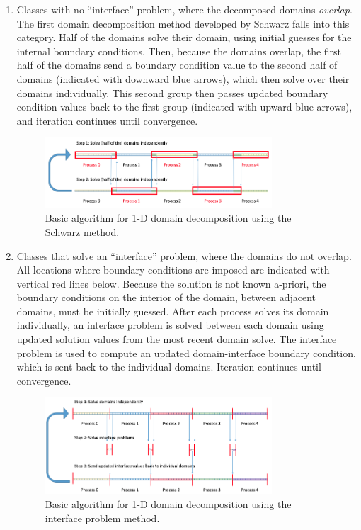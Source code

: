 \documentclass[10pt]{article}
\begin{document}
\begin{enumerate}
\item Classes with no ``interface'' problem, where the decomposed domains {\it overlap}. The first domain decomposition method developed by Schwarz falls into this category. Half of the domains solve their domain, using initial guesses for the internal boundary conditions. Then, because the domains overlap, the first half of the domains send a boundary condition value to the second half of domains (indicated with downward blue arrows), which then solve over their domains individually. This second group then passes updated boundary condition values back to the first group (indicated with upward blue arrows), and iteration continues until convergence. 

\begin{figure}[H]
\centering
\includegraphics[width=0.8\textwidth]{../figures/1D-schwarz2.png}
\caption{Basic algorithm for 1-D domain decomposition using the Schwarz method.}
\end{figure}

\item Classes that solve an ``interface'' problem, where the domains do not overlap. All locations where boundary conditions are imposed are indicated with vertical red lines below. Because the solution is not known a-priori, the boundary conditions on the interior of the domain, between adjacent domains, must be initially guessed. After each process solves its domain individually, an interface problem is solved between each domain using updated solution values from the most recent domain solve. The interface problem is used to compute an updated domain-interface boundary condition, which is sent back to the individual domains. Iteration continues until convergence.

\begin{figure}[H]
\centering
\includegraphics[width=0.8\textwidth]{../figures/1D-dd2.png}
\caption{Basic algorithm for 1-D domain decomposition using the interface problem method.}
\end{figure}


\end{enumerate}
\end{document}
